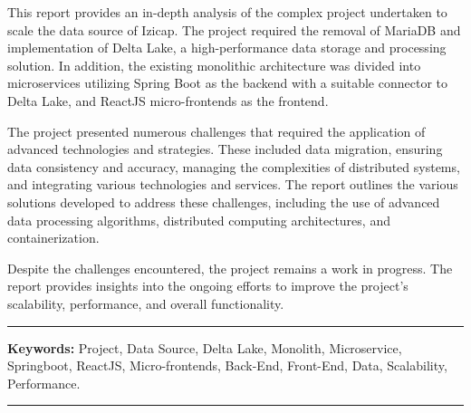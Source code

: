 \resumeAn

This report provides an in-depth analysis of the complex project undertaken to scale the data source of Izicap. The project required the removal of MariaDB and implementation of Delta Lake, a high-performance data storage and processing solution. In addition, the existing monolithic architecture was divided into microservices utilizing Spring Boot as the backend with a suitable connector to Delta Lake, and ReactJS micro-frontends as the frontend.

\medskip

The project presented numerous challenges that required the application of advanced technologies and strategies. These included data migration, ensuring data consistency and accuracy, managing the complexities of distributed systems, and integrating various technologies and services. The report outlines the various solutions developed to address these challenges, including the use of advanced data processing algorithms, distributed computing architectures, and containerization.

\medskip

Despite the challenges encountered, the project remains a work in progress. The report provides insights into the ongoing efforts to improve the project's scalability, performance, and overall functionality.

\vspace{1cm}



\noindent\rule[2pt]{\textwidth}{0.5pt}

{\textbf{Keywords:}}
Project, Data Source, Delta Lake, Monolith, Microservice, Springboot, ReactJS, Micro-frontends, Back-End, Front-End, Data, Scalability, Performance.
\\
\noindent\rule[2pt]{\textwidth}{0.5pt}
